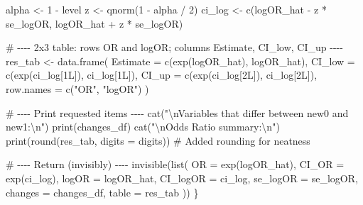 \documentclass[
  letterpaper,
  DIV=11,
  numbers=noendperiod]{scrreprt}
\newenvironment{Shaded}{\begin{snugshade}}{\end{snugshade}}
\newcommand{\AttributeTok}[1]{\textcolor[rgb]{0.40,0.45,0.13}{#1}}
\newcommand{\CommentTok}[1]{\textcolor[rgb]{0.37,0.37,0.37}{#1}}
\newcommand{\DecValTok}[1]{\textcolor[rgb]{0.68,0.00,0.00}{#1}}
\newcommand{\FunctionTok}[1]{\textcolor[rgb]{0.28,0.35,0.67}{#1}}
\newcommand{\NormalTok}[1]{\textcolor[rgb]{0.00,0.23,0.31}{#1}}
\newcommand{\OtherTok}[1]{\textcolor[rgb]{0.00,0.23,0.31}{#1}}
\newcommand{\SpecialCharTok}[1]{\textcolor[rgb]{0.37,0.37,0.37}{#1}}
\newcommand{\StringTok}[1]{\textcolor[rgb]{0.13,0.47,0.30}{#1}}
\begin{document}
\begin{Shaded}
\begin{Highlighting}[]
\NormalTok{  alpha  }\OtherTok{\textless{}{-}} \DecValTok{1} \SpecialCharTok{{-}}\NormalTok{ level}
\NormalTok{  z      }\OtherTok{\textless{}{-}} \FunctionTok{qnorm}\NormalTok{(}\DecValTok{1} \SpecialCharTok{{-}}\NormalTok{ alpha }\SpecialCharTok{/} \DecValTok{2}\NormalTok{)}
\NormalTok{  ci\_log }\OtherTok{\textless{}{-}} \FunctionTok{c}\NormalTok{(logOR\_hat }\SpecialCharTok{{-}}\NormalTok{ z }\SpecialCharTok{*}\NormalTok{ se\_logOR, logOR\_hat }\SpecialCharTok{+}\NormalTok{ z }\SpecialCharTok{*}\NormalTok{ se\_logOR)}

  \CommentTok{\# {-}{-}{-}{-} 2x3 table: rows OR and logOR; columns Estimate, CI\_low, CI\_up {-}{-}{-}{-}}
\NormalTok{  res\_tab }\OtherTok{\textless{}{-}} \FunctionTok{data.frame}\NormalTok{(}
    \AttributeTok{Estimate =} \FunctionTok{c}\NormalTok{(}\FunctionTok{exp}\NormalTok{(logOR\_hat),          logOR\_hat),}
    \AttributeTok{CI\_low   =} \FunctionTok{c}\NormalTok{(}\FunctionTok{exp}\NormalTok{(ci\_log[}\DecValTok{1}\NormalTok{L]),         ci\_log[}\DecValTok{1}\NormalTok{L]),}
    \AttributeTok{CI\_up    =} \FunctionTok{c}\NormalTok{(}\FunctionTok{exp}\NormalTok{(ci\_log[}\DecValTok{2}\NormalTok{L]),         ci\_log[}\DecValTok{2}\NormalTok{L]),}
    \AttributeTok{row.names =} \FunctionTok{c}\NormalTok{(}\StringTok{"OR"}\NormalTok{, }\StringTok{"logOR"}\NormalTok{)}
\NormalTok{  )}

  \CommentTok{\# {-}{-}{-}{-} Print requested items {-}{-}{-}{-}}
  \FunctionTok{cat}\NormalTok{(}\StringTok{"}\SpecialCharTok{\textbackslash{}n}\StringTok{Variables that differ between new0 and new1:}\SpecialCharTok{\textbackslash{}n}\StringTok{"}\NormalTok{)}
  \FunctionTok{print}\NormalTok{(changes\_df)}
  \FunctionTok{cat}\NormalTok{(}\StringTok{"}\SpecialCharTok{\textbackslash{}n}\StringTok{Odds Ratio summary:}\SpecialCharTok{\textbackslash{}n}\StringTok{"}\NormalTok{)}
  \FunctionTok{print}\NormalTok{(}\FunctionTok{round}\NormalTok{(res\_tab, }\AttributeTok{digits =}\NormalTok{ digits)) }\CommentTok{\# Added rounding for neatness}

  \CommentTok{\# {-}{-}{-}{-} Return (invisibly) {-}{-}{-}{-}}
  \FunctionTok{invisible}\NormalTok{(}\FunctionTok{list}\NormalTok{(}
    \AttributeTok{OR        =} \FunctionTok{exp}\NormalTok{(logOR\_hat),}
    \AttributeTok{CI\_OR     =} \FunctionTok{exp}\NormalTok{(ci\_log),}
    \AttributeTok{logOR     =}\NormalTok{ logOR\_hat,}
    \AttributeTok{CI\_logOR  =}\NormalTok{ ci\_log,}
    \AttributeTok{se\_logOR  =}\NormalTok{ se\_logOR,}
    \AttributeTok{changes   =}\NormalTok{ changes\_df,}
    \AttributeTok{table     =}\NormalTok{ res\_tab}
\NormalTok{  ))}
\NormalTok{\}}


\end{Highlighting}
\end{Shaded}
\end{document}
